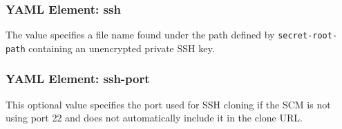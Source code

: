 \subsubsection{YAML Element: ssh}\label{sec:yaml-clone-auth-ssh}
The value specifies a file name found under the path defined by \texttt{secret-root-path} containing an unencrypted private SSH key.

\subsubsection{YAML Element: ssh-port}\label{sec:yaml-clone-auth-ssh-port}
This optional value specifies the port used for SSH cloning if the SCM is not using port 22
and does not automatically include it in the clone URL.

